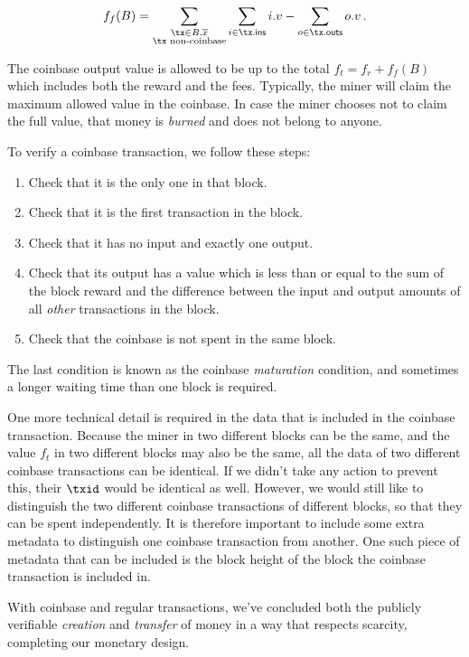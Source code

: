 \[
    f_f(B) = \sum_{\substack{\tx \in B\textsf{.}\overline{x}\\\tx \text{ non-coinbase}}}{\sum_{i \in \tx\textsf{.ins}} i.v - \sum_{o \in \tx\textsf{.outs}} o.v}\,.
\]

The coinbase output value is allowed to be up to the total $f_t = f_r + f_f(B)$ which includes both
the reward and the fees. Typically, the miner will claim the maximum allowed value in the coinbase.
In case the miner chooses not to claim the full value, that money is \emph{burned} and does not belong
to anyone.

To verify a coinbase transaction, we follow these steps:
\begin{enumerate}
    \item Check that it is the only one in that block.
    \item Check that it is the first transaction in the block.
    \item Check that it has no input and exactly one output.
    \item Check that its output has a value which is less than or equal to the sum of the block reward and the difference between the input and output amounts of all \emph{other} transactions in the block.
    \item Check that the coinbase is not spent in the same block.
\end{enumerate}

The last condition is known as the coinbase \emph{maturation} condition,
and sometimes a longer waiting time than one block is required.

One more technical detail is required in the data that is included in the coinbase transaction.
Because the miner in two different blocks can be the same, and the value $f_t$ in two different
blocks may also be the same, all the data of two different coinbase transactions can be identical.
If we didn't take any action to prevent this, their $\txid$ would be identical as well.
However, we would still like to distinguish the two different coinbase transactions of different
blocks, so that they can be spent independently. It is therefore important to include some extra
metadata to distinguish one coinbase transaction from another. One such piece of metadata that
can be included is the block height of the block the coinbase transaction is included in.

With coinbase and regular transactions, we've concluded both the publicly verifiable \emph{creation}
and \emph{transfer} of money in a way that respects scarcity, completing our monetary design.

